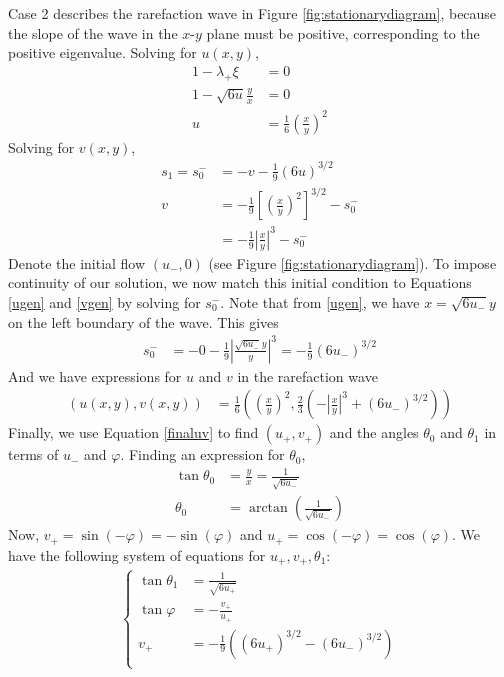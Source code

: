 \documentclass[12pt]{article}
\numberwithin{equation}{section}
\begin{document}
Case 2 describes the rarefaction wave in Figure \ref{fig:stationarydiagram}, because the slope of the wave in the $x$-$y$ plane must be positive, corresponding to the positive eigenvalue. Solving for $u(x,y)$,
\begin{align}
    1-\lambda_+\xi &= 0 \nonumber \\
    1-\sqrt{6u}\frac{y}{x} &= 0 \nonumber \\
    u &= \frac{1}{6}\left(\frac{x}{y}\right)^2
    \label{ugen}
\end{align}
 Solving for $v(x,y)$,
\begin{align}
    s_1=s_0^-&=-v-\frac{1}{9}(6u)^{3/2} \nonumber \\ 
    v &= -\frac{1}{9}\left[\left(\frac{x}{y}\right)^2\right]^{3/2}-s_0^- \nonumber \\
    &=  -\frac{1}{9}\left|\frac{x}{y}\right|^3-s_0^-
    \label{vgen}
\end{align}
Denote the initial flow $(u_-,0)$ (see Figure \ref{fig:stationarydiagram}). To impose continuity of our solution, we now match this initial condition to Equations \ref{ugen} and \ref{vgen} by solving for $s_0^-$. Note that from \ref{ugen}, we have $x=\sqrt{6u_-}y$ on the left boundary of the wave. This gives
\begin{align}
    s_0^- &= -0-\frac{1}{9}\left|\frac{\sqrt{6u_-}y}{y}\right|^3 = -\frac{1}{9}(6u_-)^{3/2}
\end{align}
And we have expressions for $u$ and $v$ in the rarefaction wave
\begin{align}
    (u(x,y),v(x,y)) &= 
    \frac{1}{6}\left(\left(\frac{x}{y}\right)^2,\frac{2}{3}\left(-\left|\frac{x}{y}\right|^3+(6u_-)^{3/2}\right)\right) 
    \label{finaluv}
\end{align}
Finally, we use Equation \ref{finaluv} to find $(u_+,v_+)$ and the angles $\theta_0$ and $\theta_1$ in terms of $u_-$ and $\varphi$. Finding an expression for $\theta_0$, 
\begin{align}
    \tan \theta_0 &=\frac{y}{x} = \frac{1}{\sqrt{6u_-}} \nonumber \\
    \theta_0 &= \arctan\left(\frac{1}{\sqrt{6u_-}}\right)
\end{align}
Now, $v_+=\sin(-\varphi) = -\sin(\varphi)$ and $u_+ = \cos(-\varphi) = \cos(\varphi)$. We have the following system of equations for $u_+,v_+,\theta_1$:
\begin{align} 
\left\{
\begin{array}{rl}
     \tan \theta_1 &= \frac{1}{\sqrt{6u_+}} \\
     \tan \varphi &= -\frac{v_+}{u_+} \\
     v_+ &= -\frac{1}{9}\left((6u_+)^{3/2}-(6u_-)^{3/2}\right) \\
\end{array}\right.
\end{align}
\end{document}
